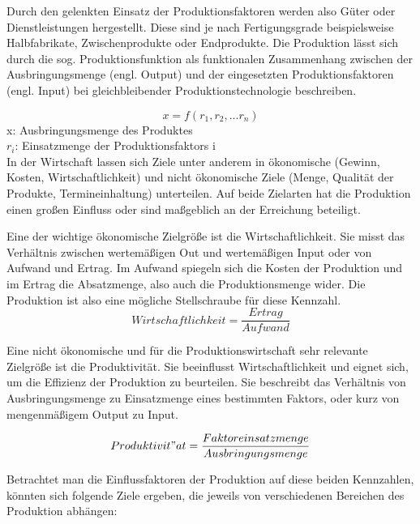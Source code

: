 \documentclass[a4paper,12pt, german]{report}
\begin{document}
Durch den gelenkten Einsatz der Produktionsfaktoren werden also Güter oder Dienstleistungen hergestellt. Diese sind je nach Fertigungsgrade beispielsweise Halbfabrikate, Zwischenprodukte oder Endprodukte.\cite{12}
Die Produktion lässt sich durch die sog. Produktionsfunktion als funktionalen Zusammenhang zwischen der Ausbringungsmenge (engl. Output) und der eingesetzten Produktionsfaktoren (engl. Input) bei gleichbleibender Produktionstechnologie beschreiben. \cite{20}

\begin{equation}
  x = f(r_1,r_2,...r_n) 
\end{equation}
x: Ausbringungsmenge des Produktes \\
$r_{i}$: Einsatzmenge der Produktionsfaktors i \\


In der Wirtschaft lassen sich Ziele unter anderem in ökonomische (Gewinn, Kosten, Wirtschaftlichkeit) und nicht ökonomische Ziele (Menge, Qualität der Produkte, Termineinhaltung) unterteilen.  Auf beide Zielarten hat die Produktion einen großen Einfluss oder sind maßgeblich an der Erreichung beteiligt.

Eine der wichtige ökonomische Zielgröße ist die Wirtschaftlichkeit. Sie misst das Verhältnis zwischen wertemäßigen Out und wertemäßigen Input oder von Aufwand und Ertrag. Im Aufwand spiegeln sich die Kosten der Produktion und im Ertrag die Absatzmenge, also auch die Produktionsmenge wider. Die Produktion ist also eine mögliche Stellschraube für diese Kennzahl.
\begin{equation}
  Wirtschaftlichkeit =\frac{Ertrag}{Aufwand}
\end{equation}



Eine nicht ökonomische und für die Produktionswirtschaft sehr relevante Zielgröße ist die Produktivität. Sie beeinflusst Wirtschaftlichkeit und eignet sich, um die Effizienz der Produktion zu beurteilen. Sie beschreibt das Verhältnis von Ausbringungsmenge zu Einsatzmenge eines bestimmten Faktors, oder kurz von mengenmäßigem Output zu Input. 

\begin{equation}
  Produktivit"at =\frac{Faktoreinsatzmenge}{Ausbringungsmenge}
\end{equation}



Betrachtet man die Einflussfaktoren der Produktion auf diese beiden Kennzahlen, könnten sich folgende Ziele ergeben, die jeweils von verschiedenen Bereichen des Produktion abhängen: 
\end{document}

